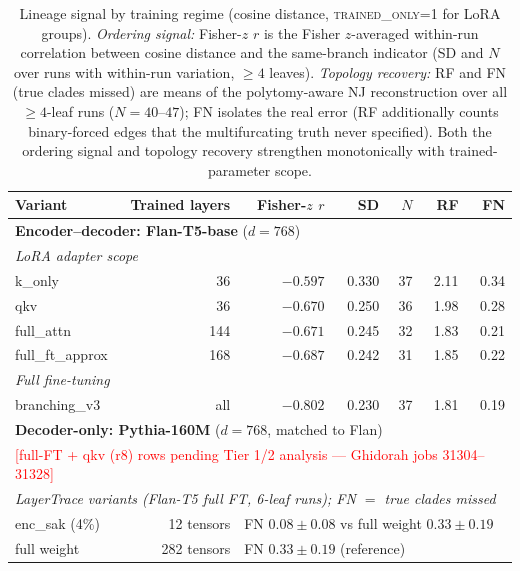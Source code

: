 \documentclass{article}
\begin{document}
\begin{table}[t]
\caption{Lineage signal by training regime (cosine distance, \textsc{trained\_only=1} for
  LoRA groups). \emph{Ordering signal:} Fisher-$z$ $r$ is the Fisher $z$-averaged within-run
  correlation between cosine distance and the same-branch indicator (SD and $N$ over runs with
  within-run variation, $\geq 4$ leaves). \emph{Topology recovery:} RF and FN (true clades
  missed) are means of the polytomy-aware NJ reconstruction over all $\geq 4$-leaf runs
  ($N=40$--$47$); FN isolates the real error (RF additionally counts binary-forced edges that
  the multifurcating truth never specified). Both the ordering signal and topology recovery
  strengthen monotonically with trained-parameter scope.}
\label{tab:variants}
\begin{center}
\begin{tabular}{lrrrrrr}
\toprule
Variant & Trained layers & Fisher-$z$ $r$ & SD & $N$ & RF & FN \\
\midrule
\multicolumn{7}{l}{\textbf{Encoder--decoder: Flan-T5-base} ($d=768$)} \\
\multicolumn{7}{l}{\quad\textit{LoRA adapter scope}} \\
\quad k\_only          &  36 & $-0.597$ & 0.330 & 37 & 2.11 & 0.34 \\
\quad qkv              &  36 & $-0.670$ & 0.250 & 36 & 1.98 & 0.28 \\
\quad full\_attn       & 144 & $-0.671$ & 0.245 & 32 & 1.83 & 0.21 \\
\quad full\_ft\_approx & 168 & $-0.687$ & 0.242 & 31 & 1.85 & 0.22 \\
\multicolumn{7}{l}{\quad\textit{Full fine-tuning}} \\
\quad branching\_v3    & all & $-0.802$ & 0.230 & 37 & 1.81 & 0.19 \\
\midrule
\multicolumn{7}{l}{\textbf{Decoder-only: Pythia-160M} ($d=768$, matched to Flan)} \\
\multicolumn{7}{l}{\quad\textcolor{red}{[full-FT + qkv (r8) rows pending Tier 1/2 analysis --- Ghidorah jobs 31304--31328]}} \\
\midrule
\multicolumn{7}{l}{\textit{LayerTrace variants (Flan-T5 full FT, 6-leaf runs); FN $=$ true clades missed}} \\
enc\_sak (4\%) & 12 tensors & \multicolumn{5}{l}{FN $0.08 \pm 0.08$ vs full weight $0.33 \pm 0.19$} \\
full weight    & 282 tensors & \multicolumn{5}{l}{FN $0.33 \pm 0.19$ (reference)} \\
\bottomrule
\end{tabular}
\end{center}
\end{table}
\end{document}
